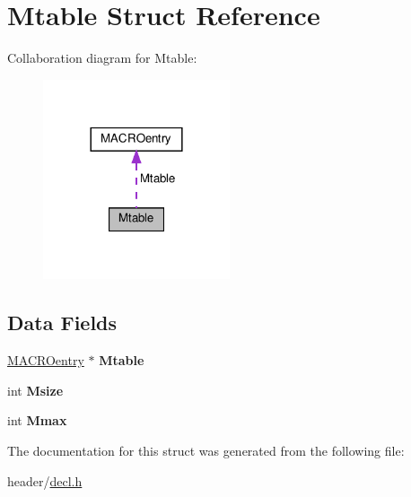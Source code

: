\hypertarget{struct_mtable}{}\section{Mtable Struct Reference}
\label{struct_mtable}


Collaboration diagram for Mtable\+:\nopagebreak
\begin{figure}[H]
\begin{center}
\leavevmode
\includegraphics[width=156pt]{struct_mtable__coll__graph}
\end{center}
\end{figure}
\subsection*{Data Fields}
\begin{DoxyCompactItemize}
\item 
\mbox{\label{struct_mtable_ad0484a655e4eae46e745aebd6441b135}} 
\hyperlink{struct_m_a_c_r_oentry}{M\+A\+C\+R\+Oentry} $\ast$ {\bfseries Mtable}
\item 
\mbox{\label{struct_mtable_ac6e9569a0a0277558387c0577d73b746}} 
int {\bfseries Msize}
\item 
\mbox{\label{struct_mtable_aa6d3d414d4977af387a63b8563de99d4}} 
int {\bfseries Mmax}
\end{DoxyCompactItemize}


The documentation for this struct was generated from the following file\+:\begin{DoxyCompactItemize}
\item 
header/\hyperlink{decl_8h}{decl.\+h}\end{DoxyCompactItemize}
